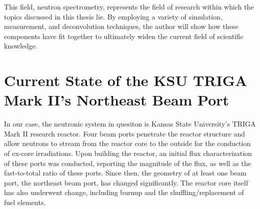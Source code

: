 This field, neutron spectrometry, represents the field of research within which the topics discussed in this thesis lie.
By employing a variety of simulation, measurement, and deconvolution techniques, the author will show how these components have fit together to ultimately widen the current field of scientific knowledge.



\section{Current State of the KSU TRIGA Mark II's Northeast Beam Port}
In our case, the neutronic system in quesiton is Kansas State University's TRIGA Mark II research reactor.
Four beam ports penetrate the reactor structure and allow neutrons to stream from the reactor core to the outside for the conduction of ex-core irradiations.
Upon building the reactor, an initial flux characterization of these ports was conducted, reporting the magnitude of the flux, as well as the fast-to-total ratio of these ports.
Since then, the geometry of at least one beam port, the northeast beam port, has changed significantly.
The reactor core itself has also underwent change, including burnup and the shuffling/replacement of fuel elements.

